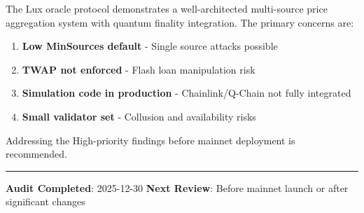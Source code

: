 \documentclass[
]{article}
\providecommand{\tightlist}{%
  \setlength{\itemsep}{0pt}\setlength{\parskip}{0pt}}
\begin{document}
The Lux oracle protocol demonstrates a well-architected multi-source
price aggregation system with quantum finality integration. The primary
concerns are:

\begin{enumerate}
\def\labelenumi{\arabic{enumi}.}
\tightlist
\item
  \textbf{Low MinSources default} - Single source attacks possible
\item
  \textbf{TWAP not enforced} - Flash loan manipulation risk
\item
  \textbf{Simulation code in production} - Chainlink/Q-Chain not fully
  integrated
\item
  \textbf{Small validator set} - Collusion and availability risks
\end{enumerate}

Addressing the High-priority findings before mainnet deployment is
recommended.

\begin{center}\rule{0.5\linewidth}{0.5pt}\end{center}

\textbf{Audit Completed}: 2025-12-30 \textbf{Next Review}: Before
mainnet launch or after significant changes
\end{document}
